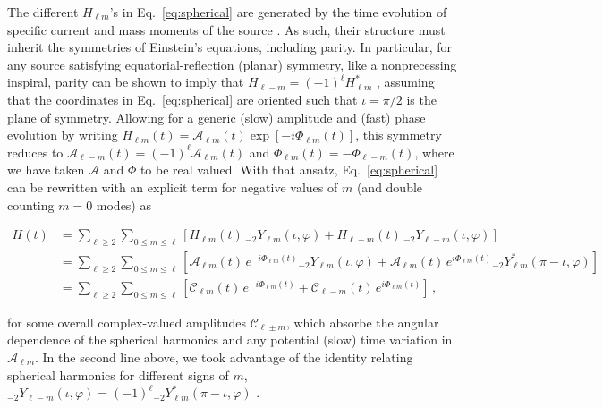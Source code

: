 \documentclass[aps,prd,twocolumn,superscriptaddress,preprintnumbers,floatfix,nofootinbib]{revtex4-2}
\newcommand*{\eq}[1]{Eq.~\eqref{eq:#1}}
\begin{document}
The different $H_{\ell m}$'s in \eq{spherical} are generated by the time evolution of specific current and mass moments of the source \cite{Thorne:1980ru}.
As such, their structure must inherit the symmetries of Einstein's equations, including parity.
In particular, for any source satisfying equatorial-reflection (planar) symmetry, like a nonprecessing inspiral, parity can be shown to imply that $H_{\ell -m} = (-1)^\ell H_{\ell m}^*$ \cite{Faye:2012we}, assuming that the coordinates in \eq{spherical} are oriented such that $\iota=\pi/2$ is the plane of symmetry.
Allowing for a generic (slow) amplitude and (fast) phase evolution by writing $H_{\ell m}(t) = \mathcal{A}_{\ell m}(t) \exp[-i \Phi_{\ell m}(t)]$, this symmetry reduces to $\mathcal{A}_{\ell -m}(t) = (-1)^\ell \mathcal{A}_{\ell m}(t)$ and $\Phi_{\ell m}(t) = - \Phi_{\ell -m}(t)$, where we have taken $\mathcal{A}$ and $\Phi$ to be real valued.
With that ansatz, \eq{spherical} can be rewritten with an explicit term for negative values of $m$ (and double counting $m=0$ modes) as
\begin{widetext}
\begin{subequations} \label{eq:spherical_modes}
\begin{align}
H(t) &= \sum_{\ell \geq 2} \sum_{0\leq m \leq \ell} \left[H_{\ell m}(t)\, {}_{-2}Y_{\ell m} (\iota, \varphi) + H_{\ell -m}(t)\, {}_{-2}Y_{\ell -m} (\iota, \varphi) \right] \\
&= \sum_{\ell \geq 2} \sum_{0\leq m \leq \ell} \left[\mathcal{A}_{\ell m}(t)\, e^{-i\Phi_{\ell m} (t)} {}_{-2}Y_{\ell m}(\iota, \varphi) +  \mathcal{A}_{\ell m}(t)\, e^{i\Phi_{\ell m} (t)} {}_{-2}Y_{\ell m}^*(\pi-\iota, \varphi) \right] \\
&= \sum_{\ell \geq 2} \sum_{0\leq m \leq \ell} \left[\mathcal{C}_{\ell m}(t)\, e^{-i\Phi_{\ell m} (t)}  +  \mathcal{C}_{\ell -m}(t)\, e^{i\Phi_{\ell m} (t)} \right]\, ,
\end{align}
\end{subequations}
\end{widetext}
for some overall complex-valued amplitudes $\mathcal{C}_{\ell \pm m}$, which absorbe the angular dependence of the spherical harmonics and any potential (slow) time variation in $\mathcal{A}_{\ell m}$.
In the second line above, we took advantage of the identity relating spherical harmonics for different signs of $m$, ${}_{-2} Y_{\ell -m}(\iota,\varphi) = (-1)^{\ell} {}_{-2} Y_{\ell m}^*(\pi-\iota,\varphi)$ \cite{goldberg:1967}.
\end{document}
